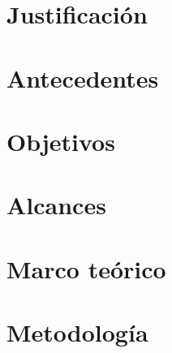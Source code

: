 \documentclass[11pt, letterpaper, twoside, openright]{report}
\newcommand{\defaultparformat}[1]{
	{\setlength{\parskip}{2ex}
     }
}
\begin{document}
\ifdefined\CAPjustificacion
	\newpage
	\chapter{Justificación}
	\ifdefined\parpordefecto
		\defaultparformat{g-justificacion}
	\else
		
	\fi
\fi

\ifdefined\CAPantecedentes
	\newpage
	\chapter{Antecedentes}
	\ifdefined\parpordefecto
		\defaultparformat{h-antecedentes}
	\else
		
	\fi
\fi

\ifdefined\CAPobjetivos
	\newpage
	\chapter{Objetivos}
	\ifdefined\parpordefecto
		\defaultparformat{i-objetivos}
	\else
		
	\fi
\fi

\ifdefined\CAPalcance
	\newpage
	\chapter{Alcances}
	\ifdefined\parpordefecto
		\defaultparformat{j-alcance}
	\else
		
	\fi
\fi

\ifdefined\CAPmarcoteorico
	\newpage
	\chapter{Marco teórico}
	\ifdefined\parpordefecto
		\defaultparformat{k-marco_teorico}
	\else
		
	\fi
\fi

\ifdefined\CAPmetodologia
	\newpage
	\chapter{Metodología}
	\ifdefined\parpordefecto
		\defaultparformat{l-metodologia}
	\else
		
	\fi
\fi
\end{document}
